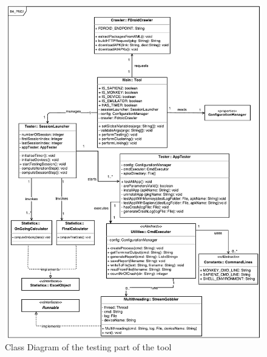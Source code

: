 \begin{figure}[t]
\centering 
\includegraphics[width=\columnwidth]{diagrams/testing.pdf} 
\caption{Class Diagram of the testing part of the tool }
\label{testing}
\vspace{-3mm} 
\end{figure}



